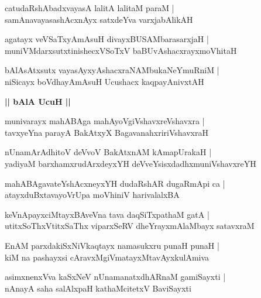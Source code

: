 \documentclass[twoside,12pt,openright]{book}
\newcounter{shloka}[chapter]
\def\uvaca#1{\centerline{{\large\textbf{#1}}}}
\begin{document}
\begin{shloka}%
catudaRshAbadxvayasA lalitA lalitaM paraM |\\
samAnavayasashAcxnAyx satxdeYva varxjabAlikAH
\end{shloka}

\begin{shloka}%
agatayx veVSaTxyAmAsuH divayxBUSAMbarasarxjaH |\\
muniVMdarxsutxtinishecxVSoTxV baBUvAshacxrayxmoVhitaH 
\end{shloka}

\begin{shloka}%
bAlAsAtxsutx vayasAyxyAshacxraNAMbukaNeYmuRniM |\\
niSicayx boVdhayAmAsuH Ucushacx kaqpayAnivxtAH 
\end{shloka}

\uvaca{|| bAlA UcuH ||}

\begin{shloka}%
munivarayx mahABAga mahAyoVgiVshavxreVshavxra |\\
tavxyeYna parayA BakAtxyX BagavanahxririVshavxraH 
\end{shloka}

\begin{shloka}%
nUnamArAdhitoV deVvoV BakAtxnAM kAmapUrakaH |\\
yadiyaM barxhamxrudArxdeyxYH deVveYsisxdadhxmuniVshavxreYH 
\end{shloka}

\begin{shloka}%
mahABAgavateYshAcxneyxYH dudaRshAR dugaRmApi ca |\\
atayxduBxtavayoVrUpa moVhiniV harivalalxBA 
\end{shloka}

\begin{shloka}%
keVnApayxciMtayxBAveVna tava daqSiTxpathaM gatA |\\
utitxSoThxVtitxSaThx viparxSeRV dheYrayxmAlaMbayx satavxraM 
\end{shloka}

\begin{shloka}%
EnAM parxdakiSxNiVkaqtayx namasukxru punaH punaH |\\
kiM na pashayxsi cAravxMgiVmatayxMtavAyxkulAmiva 
\end{shloka}

\begin{shloka}%
asimxnenxVva kaSxNeV nUnamanatxdhARnaM gamiSayxti |\\
nAnayA saha salAlxpaH kathaMcitetxV BaviSayxti 
\end{shloka}
\end{document}
